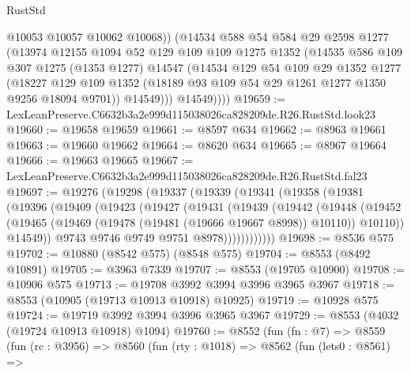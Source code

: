 \begin{lexlean}{RustStd}
\begin{coremodule}
              @10053
              @10057
              @10062
              @10068))
          (@14534
            @588
            @54
            @584
            @29
            @2598
            @1277
            (@13974
              @12155
              @1094
              @52
              @129
              @109
              @109
              @1275
              @1352
              (@14535
                @586
                @109
                @307
                @1275
                (@1353 @1277)
                @14547
                (@14534
                  @129
                  @54
                  @109
                  @29
                  @1352
                  @1277
                  (@18227
                    @129
                    @109
                    @1352
                    (@18189 @93 @109 @54 @29 @1261 @1277 @1350 @9256 @18094 @9701))
                  @14549)))
            @14549))))
@19659 := LexLeanPreserve.C6632b3a2e999d115038026ca828209de.R26.RustStd.look23
@19660 := @19658 @19659
@19661 := @8597 @634
@19662 := @8963 @19661
@19663 := @19660 @19662
@19664 := @8620 @634
@19665 := @8967 @19664
@19666 := @19663 @19665
@19667 := LexLeanPreserve.C6632b3a2e999d115038026ca828209de.R26.RustStd.fal23
@19697 := @19276
    (@19298
      (@19337
        (@19339
          (@19341
            (@19358
              (@19381
                (@19396
                  (@19409
                    (@19423
                      (@19427
                        (@19431
                          (@19439
                            (@19442
                              (@19448
                                (@19452
                                  (@19465
                                    (@19469 (@19478 (@19481 (@19666 @19667 @8998)) @10110))
                                    @10110))
                                @14549))
                            @9743
                            @9746
                            @9749
                            @9751
                            @8978))))))))))))
@19698 := @8536 @575
@19702 := @10880 (@8542 @575) (@8548 @575)
@19704 := @8553 (@8492 @10891)
@19705 := @3963 @7339
@19707 := @8553 (@19705 @10900)
@19708 := @10906 @575
@19713 := @19708 @3992 @3994 @3996 @3965 @3967
@19718 := @8553 (@10905 (@19713 @10913 @10918) @10925)
@19719 := @10928 @575
@19724 := @19719 @3992 @3994 @3996 @3965 @3967
@19729 := @8553 (@4032 (@19724 @10913 @10918) @1094)
@19760 := @8552
    (fun (fn : @7) =>
    @8559
      (fun (rc : @3956) =>
      @8560
        (fun (rty : @1018) =>
        @8562
          (fun (lets0 : @8561) =>

\end{coremodule}
\end{lexlean}
